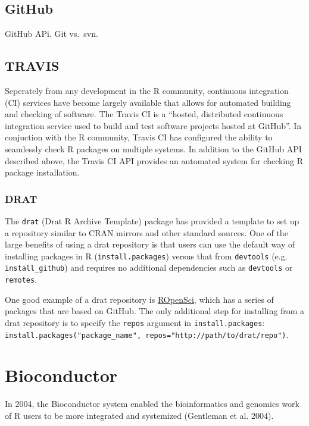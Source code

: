 \documentclass[]{elsarticle} %
\begin{document}
\subsection{GitHub}\label{github}

GitHub APi. Git vs.~svn.

\subsection{TRAVIS}\label{travis}

Seperately from any development in the R community, continuous
integration (CI) services have become largely available that allows for
automated building and checking of software. The Travis CI is a
``hosted, distributed continuous integration service used to build and
test software projects hosted at GitHub''. In conjuction with the R
community, Travis CI has configured the ability to seamlessly check R
packages on multiple systems. In addition to the GitHub API described
above, the Travis CI API provides an automated system for checking R
package installation.

\subsubsection{DRAT}\label{drat}

The \texttt{drat} (Drat R Archive Template) package has provided a
template to set up a repository similar to CRAN mirrors and other
standard sources. One of the large benefits of using a drat repository
is that users can use the default way of installing packages in R
(\texttt{install.packages}) versus that from \texttt{devtools} (e.g.
\texttt{install\_github}) and requires no additional dependencies such
as \texttt{devtools} or \texttt{remotes}.

One good example of a drat repository is
\href{https://ropensci.org/}{ROpenSci}, which has a series of packages
that are based on GitHub. The only additional step for installing from a
drat repository is to specify the \texttt{repos} argument in
\texttt{install.packages}:
\texttt{install.packages("package\_name",\ repos="http://path/to/drat/repo")}.

\section{Bioconductor}\label{bioconductor}

In 2004, the Bioconductor system enabled the bioinformatics and genomics
work of R users to be more integrated and systemized (Gentleman et al.
2004).
\end{document}
